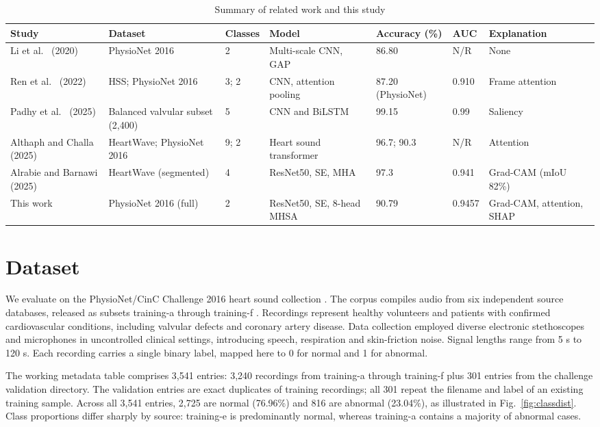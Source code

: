 \documentclass[conference]{IEEEtran}
\begin{document}
\begin{table}[t]
\caption{Summary of related work and this study}
\label{tab:lit}
\centering
\footnotesize
\renewcommand{\arraystretch}{1.15}
\begin{tabular}{p{2.4cm} p{3.5cm} p{0.9cm} p{3.5cm} p{1.6cm} p{1.1cm} p{2.3cm}}
\toprule
Study & Dataset & Classes & Model & Accuracy (\%) & AUC & Explanation \\
\midrule
Li et al.\ \cite{li} (2020) & PhysioNet 2016 & 2 & Multi-scale CNN, GAP & 86.80 & N/R & None \\
Ren et al.\ \cite{ren} (2022) & HSS; PhysioNet 2016 & 3; 2 & CNN, attention pooling & 87.20 (PhysioNet) & 0.910 & Frame attention \\
Padhy et al.\ \cite{padhy} (2025) & Balanced valvular subset (2,400) & 5 & CNN and BiLSTM & 99.15 & 0.99 & Saliency \\
Althaph and Challa \cite{althaph} (2025) & HeartWave; PhysioNet 2016 & 9; 2 & Heart sound transformer & 96.7; 90.3 & N/R & Attention \\
Alrabie and Barnawi \cite{alrabie} (2025) & HeartWave (segmented) & 4 & ResNet50, SE, MHA & 97.3 & 0.941 & Grad-CAM (mIoU 82\%) \\
This work & PhysioNet 2016 (full) & 2 & ResNet50, SE, 8-head MHSA & 90.79 & 0.9457 & Grad-CAM, attention, SHAP \\
\bottomrule
\end{tabular}
\end{table}

\section{Dataset}
We evaluate on the PhysioNet/CinC Challenge 2016 heart sound collection \cite{clifford}. The corpus compiles audio from six independent source databases, released as subsets training-a through training-f \cite{liu}. Recordings represent healthy volunteers and patients with confirmed cardiovascular conditions, including valvular defects and coronary artery disease. Data collection employed diverse electronic stethoscopes and microphones in uncontrolled clinical settings, introducing speech, respiration and skin-friction noise. Signal lengths range from 5 s to 120 s. Each recording carries a single binary label, mapped here to 0 for normal and 1 for abnormal.

The working metadata table comprises 3,541 entries: 3,240 recordings from training-a through training-f plus 301 entries from the challenge validation directory. The validation entries are exact duplicates of training recordings; all 301 repeat the filename and label of an existing training sample. Across all 3,541 entries, 2,725 are normal (76.96\%) and 816 are abnormal (23.04\%), as illustrated in Fig.~\ref{fig:classdist}. Class proportions differ sharply by source: training-e is predominantly normal, whereas training-a contains a majority of abnormal cases.
\end{document}

